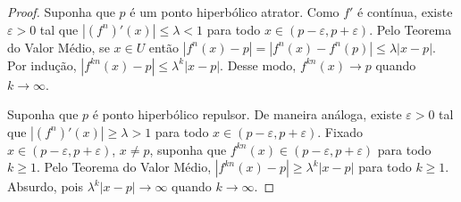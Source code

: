 \begin{proof}
Suponha que $p$ é um ponto hiperbólico atrator. Como $f'$ é contínua, existe $\varepsilon > 0$ tal que $|(f^n)'(x)| \leq \lambda < 1$ para todo $x \in (p - \varepsilon, p + \varepsilon)$. Pelo Teorema do Valor Médio, se $x \in U$ então $|f^n(x) - p| = |f^n(x) - f^n(p)| \leq \lambda|x - p|$. Por indução, $|f^{kn}(x) - p| \leq \lambda^k|x - p|$. Desse modo, $f^{kn}(x) \to p$ quando $k \to \infty$.

Suponha que $p$ é ponto hiperbólico repulsor. De maneira análoga, existe $\varepsilon > 0$ tal que $|(f^n)'(x)| \geq \lambda > 1$ para todo $x \in (p- \varepsilon, p + \varepsilon)$. Fixado $x \in (p - \varepsilon, p + \varepsilon)$, $x \neq p$, suponha que $f^{kn}(x) \in (p - \varepsilon, p + \varepsilon)$ para todo $k \geq 1$. Pelo Teorema do Valor Médio, $|f^{kn}(x) - p| \geq \lambda^k|x - p|$ para todo $k \geq 1$. Absurdo, pois $\lambda^k|x - p| \to \infty$ quando $k \to \infty$.
\end{proof}
